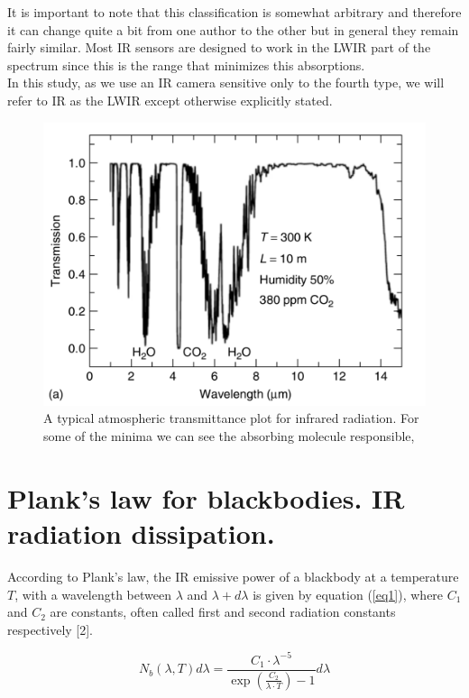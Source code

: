 		It is important to note that this classification is somewhat arbitrary and therefore it can change quite a bit from one author to the other but in general they remain fairly similar. Most IR sensors are designed to work in the LWIR part of the spectrum since this is the range that minimizes this absorptions.\\ In this study, as we use an IR camera sensitive only to the fourth type, we will refer to IR as the LWIR except otherwise explicitly stated.
		
		\begin{figure}[ht!]
			\centering
			\captionsetup{justification=centering,margin=2cm}
			\includegraphics[scale=0.45]{Figures/Chapter01/Transmission.pdf}
			\caption{\label{fig2} A typical atmospheric transmittance plot  for infrared radiation. For some of the minima we can see the absorbing molecule responsible,}
		\end{figure}
		
	\section{Plank's law for blackbodies. IR radiation dissipation.}
	
		According to Plank's law, the IR emissive power of a blackbody at a temperature $T$, with a wavelength between $\lambda$ and $\lambda+d\lambda$ is given by equation (\ref{eq1}), where $C_{1}$ and $C_{2}$ are constants, often called first and second radiation constants respectively [2].
		
		\begin{equation}
			\label{eq1}
			N_{b}(\lambda,T)d\lambda=\frac{C_{1} \cdot \lambda^{-5}}{\exp (\frac{C_{2}}{\lambda\cdot T}) -1} d\lambda
		\end{equation}
		
